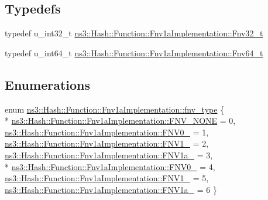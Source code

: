 \subsection*{Typedefs}
\begin{DoxyCompactItemize}
\item 
typedef u\+\_\+int32\+\_\+t \hyperlink{group__hash__fnv_ga6de33672f4d12dba1c58d1b9ff210d65}{ns3\+::\+Hash\+::\+Function\+::\+Fnv1a\+Implementation\+::\+Fnv32\+\_\+t}
\item 
typedef u\+\_\+int64\+\_\+t \hyperlink{group__hash__fnv_ga4b6673bffbef8355685a9e0129b86e16}{ns3\+::\+Hash\+::\+Function\+::\+Fnv1a\+Implementation\+::\+Fnv64\+\_\+t}
\end{DoxyCompactItemize}
\subsection*{Enumerations}
\begin{DoxyCompactItemize}
\item 
enum \hyperlink{group__hash__fnv_gade4dc6882f24a5ecd6b9d41e6698b275}{ns3\+::\+Hash\+::\+Function\+::\+Fnv1a\+Implementation\+::fnv\+\_\+type} \{ \\*
\hyperlink{group__hash__fnv_ggade4dc6882f24a5ecd6b9d41e6698b275a9ddf1e553238aab7e8c19411f88be262}{ns3\+::\+Hash\+::\+Function\+::\+Fnv1a\+Implementation\+::\+F\+N\+V\+\_\+\+N\+O\+NE} = 0, 
\hyperlink{group__hash__fnv_ggade4dc6882f24a5ecd6b9d41e6698b275ae43fe5fd2bea5e0a1a4f34144f7acb84}{ns3\+::\+Hash\+::\+Function\+::\+Fnv1a\+Implementation\+::\+F\+N\+V0\+\_} = 1, 
\hyperlink{group__hash__fnv_ggade4dc6882f24a5ecd6b9d41e6698b275af56bb58f654f4ad17f9e84e7118021a9}{ns3\+::\+Hash\+::\+Function\+::\+Fnv1a\+Implementation\+::\+F\+N\+V1\+\_} = 2, 
\hyperlink{group__hash__fnv_ggade4dc6882f24a5ecd6b9d41e6698b275a0cf8d0725ff84c31470b8041737e17ca}{ns3\+::\+Hash\+::\+Function\+::\+Fnv1a\+Implementation\+::\+F\+N\+V1a\+\_} = 3, 
\\*
\hyperlink{group__hash__fnv_ggade4dc6882f24a5ecd6b9d41e6698b275ab97f50ad95fcf2a4f11c77079e4cfeee}{ns3\+::\+Hash\+::\+Function\+::\+Fnv1a\+Implementation\+::\+F\+N\+V0\+\_} = 4, 
\hyperlink{group__hash__fnv_ggade4dc6882f24a5ecd6b9d41e6698b275a5eb69234449bf051b23d003555325bde}{ns3\+::\+Hash\+::\+Function\+::\+Fnv1a\+Implementation\+::\+F\+N\+V1\+\_} = 5, 
\hyperlink{group__hash__fnv_ggade4dc6882f24a5ecd6b9d41e6698b275a97b127307500c011595ba0cbf56903b5}{ns3\+::\+Hash\+::\+Function\+::\+Fnv1a\+Implementation\+::\+F\+N\+V1a\+\_} = 6
 \}
\end{DoxyCompactItemize}
